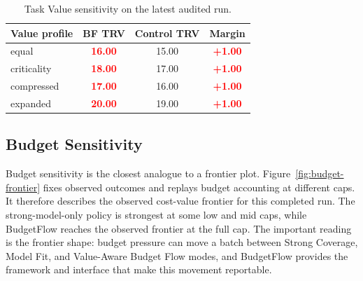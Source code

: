 \documentclass{article}
\newcommand{\method}{BudgetFlow\xspace}
\newcommand{\pos}[1]{\textcolor{red}{\textbf{#1}}}
\begin{document}
\begin{table}[t]
\centering
\small
\begin{tabular}{lccc}
\toprule
Value profile & BF TRV & Control TRV & Margin \\
\midrule
equal & \pos{16.00} & 15.00 & \pos{+1.00} \\
criticality & \pos{18.00} & 17.00 & \pos{+1.00} \\
compressed & \pos{17.00} & 16.00 & \pos{+1.00} \\
expanded & \pos{20.00} & 19.00 & \pos{+1.00} \\
\bottomrule
\end{tabular}
\caption{Task Value sensitivity on the latest audited run.}
\label{tab:value-sensitivity}
\end{table}

\subsection{Budget Sensitivity}
Budget sensitivity is the closest analogue to a frontier plot. Figure~\ref{fig:budget-frontier} fixes observed outcomes and replays budget accounting at different caps. It therefore describes the observed cost-value frontier for this completed run. The strong-model-only policy is strongest at some low and mid caps, while \method reaches the observed frontier at the full cap. The important reading is the frontier shape: budget pressure can move a batch between Strong Coverage, Model Fit, and Value-Aware Budget Flow modes, and \method provides the framework and interface that make this movement reportable.
\end{document}

